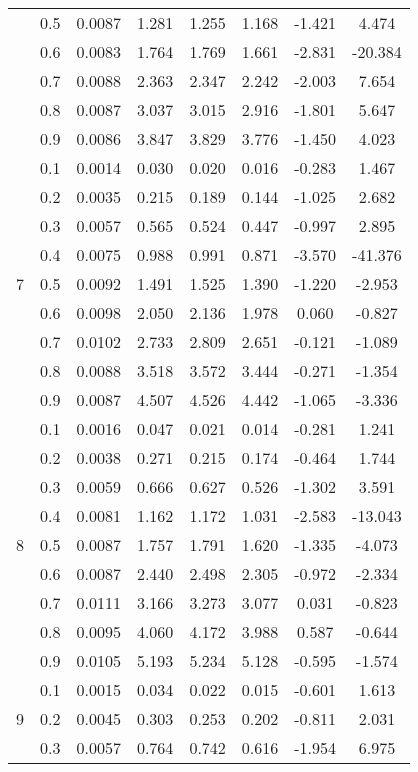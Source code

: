 \documentclass[11pt,a4paper]{report}
\begin{document}
\begin{longtable}{ | c | c || c | c | c | c | c | c | }
 & 0.5 & 0.0087 & 1.281 & 1.255 & 1.168 & -1.421 & 4.474 \\
 & 0.6 & 0.0083 & 1.764 & 1.769 & 1.661 & -2.831 & -20.384 \\
 & 0.7 & 0.0088 & 2.363 & 2.347 & 2.242 & -2.003 & 7.654 \\
 & 0.8 & 0.0087 & 3.037 & 3.015 & 2.916 & -1.801 & 5.647 \\
 & 0.9 & 0.0086 & 3.847 & 3.829 & 3.776 & -1.450 & 4.023 \\
 \hline
\multirow{9}{*}{7} & 0.1 & 0.0014 & 0.030 & 0.020 & 0.016 & -0.283 & 1.467 \\
 & 0.2 & 0.0035 & 0.215 & 0.189 & 0.144 & -1.025 & 2.682 \\
 & 0.3 & 0.0057 & 0.565 & 0.524 & 0.447 & -0.997 & 2.895 \\
 & 0.4 & 0.0075 & 0.988 & 0.991 & 0.871 & -3.570 & -41.376 \\
 & 0.5 & 0.0092 & 1.491 & 1.525 & 1.390 & -1.220 & -2.953 \\
 & 0.6 & 0.0098 & 2.050 & 2.136 & 1.978 & 0.060 & -0.827 \\
 & 0.7 & 0.0102 & 2.733 & 2.809 & 2.651 & -0.121 & -1.089 \\
 & 0.8 & 0.0088 & 3.518 & 3.572 & 3.444 & -0.271 & -1.354 \\
 & 0.9 & 0.0087 & 4.507 & 4.526 & 4.442 & -1.065 & -3.336 \\
 \hline
\multirow{9}{*}{8} & 0.1 & 0.0016 & 0.047 & 0.021 & 0.014 & -0.281 & 1.241 \\
 & 0.2 & 0.0038 & 0.271 & 0.215 & 0.174 & -0.464 & 1.744 \\
 & 0.3 & 0.0059 & 0.666 & 0.627 & 0.526 & -1.302 & 3.591 \\
 & 0.4 & 0.0081 & 1.162 & 1.172 & 1.031 & -2.583 & -13.043 \\
 & 0.5 & 0.0087 & 1.757 & 1.791 & 1.620 & -1.335 & -4.073 \\
 & 0.6 & 0.0087 & 2.440 & 2.498 & 2.305 & -0.972 & -2.334 \\
 & 0.7 & 0.0111 & 3.166 & 3.273 & 3.077 & 0.031 & -0.823 \\
 & 0.8 & 0.0095 & 4.060 & 4.172 & 3.988 & 0.587 & -0.644 \\
 & 0.9 & 0.0105 & 5.193 & 5.234 & 5.128 & -0.595 & -1.574 \\
 \hline
\multirow{9}{*}{9} & 0.1 & 0.0015 & 0.034 & 0.022 & 0.015 & -0.601 & 1.613 \\
 & 0.2 & 0.0045 & 0.303 & 0.253 & 0.202 & -0.811 & 2.031 \\
 & 0.3 & 0.0057 & 0.764 & 0.742 & 0.616 & -1.954 & 6.975 \\

\end{longtable}
\end{document}

